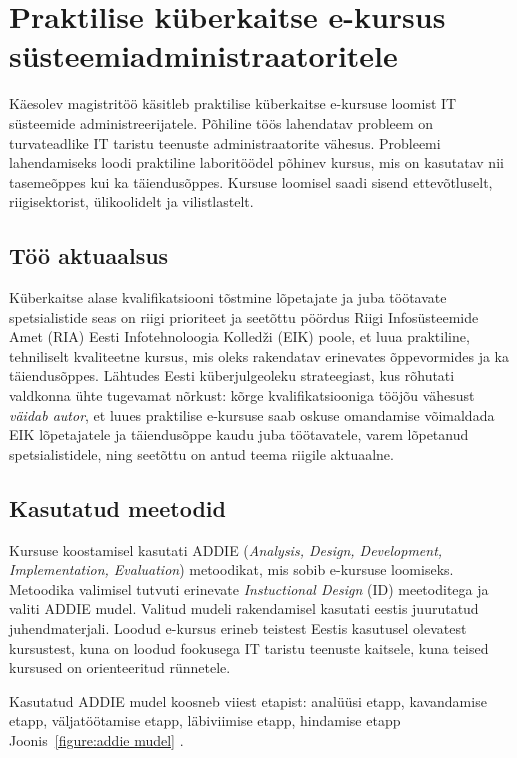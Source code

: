 \section*{Praktilise küberkaitse e-kursus
süsteemiadministraatoritele}
\label{kokkuvõte}


Käesolev magistritöö käsitleb praktilise küberkaitse e-kursuse loomist IT süsteemide administreerijatele. Põhiline töös lahendatav probleem on turvateadlike IT taristu teenuste administraatorite vähesus. Probleemi lahendamiseks loodi praktiline laboritöödel põhinev kursus, mis on kasutatav nii tasemeõppes kui ka täiendusõppes. Kursuse loomisel saadi sisend ettevõtluselt, riigisektorist, ülikoolidelt ja vilistlastelt.


\subsection*{Töö aktuaalsus}
Küberkaitse alase kvalifikatsiooni tõstmine lõpetajate ja juba töötavate spetsialistide seas on riigi prioriteet ja seetõttu pöördus Riigi Infosüsteemide Amet (\gls{RIA}) Eesti Infotehnoloogia Kolledži (\gls{EIK}) poole, et luua praktiline, tehniliselt kvaliteetne kursus, mis oleks rakendatav erinevates õppevormides ja ka täiendusõppes.
Lähtudes Eesti küberjulgeoleku strateegiast, kus rõhutati valdkonna ühte tugevamat nõrkust: kõrge kvalifikatsiooniga tööjõu vähesust \citep{Strategy2008} \emph{väidab autor}, et luues praktilise e-kursuse saab oskuse omandamise võimaldada \gls{EIK} lõpetajatele ja täiendusõppe kaudu juba töötavatele, varem lõpetanud spetsialistidele, ning seetõttu on antud teema riigile aktuaalne.


\subsection*{Kasutatud meetodid}
Kursuse koostamisel kasutati \gls{ADDIE} (\emph{Analysis, Design, Development, Implementation, Evaluation}) metoodikat, mis sobib e-kursuse loomiseks. Metoodika valimisel tutvuti erinevate \emph{Instuctional Design}  (\gls{ID}) meetoditega ja valiti \gls{ADDIE} mudel. Valitud mudeli rakendamisel kasutati eestis juurutatud juhendmaterjali\citep{OppeArenduskeskus2010}.  Loodud e-kursus erineb teistest Eestis kasutusel olevatest kursustest, kuna on loodud fookusega IT taristu teenuste kaitsele, kuna teised kursused on orienteeritud rünnetele.

Kasutatud \gls{ADDIE} mudel koosneb viiest etapist: analüüsi etapp, kavandamise etapp, väljatöötamise etapp, läbiviimise etapp, hindamise etapp  Joonis~\ref{figure:addie mudel} \citep{website:addie}.


